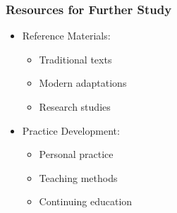 \begin{frame}[fragile]\frametitle{Resources for Further Study}
    \begin{itemize}
        \item Reference Materials:
            \begin{itemize}
                \item Traditional texts
                \item Modern adaptations
                \item Research studies
            \end{itemize}
        \item Practice Development:
            \begin{itemize}
                \item Personal practice
                \item Teaching methods
                \item Continuing education
            \end{itemize}
    \end{itemize}
\end{frame}